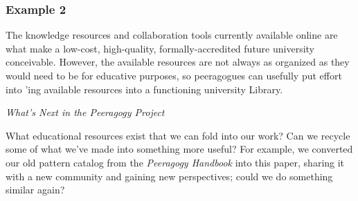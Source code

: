 \vspace{.05cm}

\subsubsection*{Example 2}
The knowledge resources and collaboration tools currently available online
are what make a low-cost, high-quality, formally-accredited future university
conceivable.  However, the available resources are not always as
organized as they would need to be for educative purposes, so peeragogues can usefully put
effort into 'ing available
resources into a functioning university Library.


\begin{framed}
\noindent 
\emph{What's Next in the Peeragogy Project}
\begin{collectinmacro}{\ReduceWN}{}{}
What educational resources exist that we can fold into our work?  Can we recycle some of what we've made into something more useful?  For example, we converted our old pattern catalog from the \emph{Peeragogy Handbook} into this paper, sharing it with a new community and gaining new perspectives; could we do something similar again?
\end{collectinmacro}
\ReduceWN
\end{framed}



    
    
